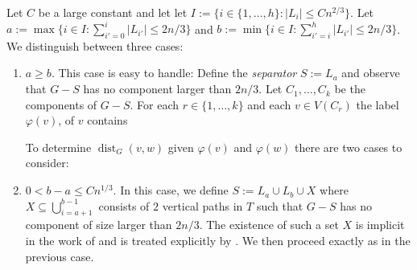 \documentclass{patmorin}
\DeclareMathOperator{\dist}{dist}
\begin{document}
Let $C$ be a large constant and let let $I:=\{i\in\{1,\ldots,h\}: |L_i|\le Cn^{2/3}\}$.
Let $a:=\max\{i\in I: \sum_{i'=0}^i |L_{i'}| \le 2n/3\}$ and $b:=\min\{i\in I: \sum_{i'=i}^h |L_{i'}| \le 2n/3\}$.  We distinguish between three cases:
\begin{enumerate}
    \item $a \ge b$.  This case is easy to handle: Define the \emph{separator} $S:=L_{a}$ and observe that $G-S$ has no component larger than $2n/3$. Let $C_1,\ldots,C_k$ be the components of $G-S$.  For each $r\in\{1,\ldots,k\}$ and each $v\in V(C_r)$ the label $\varphi(v)$, of $v$ contains
    To determine $\dist_G(v,w)$ given $\varphi(v)$ and $\varphi(w)$ there are two cases to consider:

    \item $0 < b-a \le Cn^{1/3}$.  In this case, we define $S:=L_a\cup L_b\cup X$ where $X\subseteq \bigcup_{i=a+1}^{b-1}$ consists of $2$ vertical paths in $T$ such that $G-S$ has no component of size larger than $2n/3$.  The existence of such a set $X$ is implicit in the work of \citet{lipton.tarjan:applications} and is treated explicitly by \citet{dujmovic:graph}.  We then proceed exactly as in the previous case.


\end{enumerate}
\end{document}
